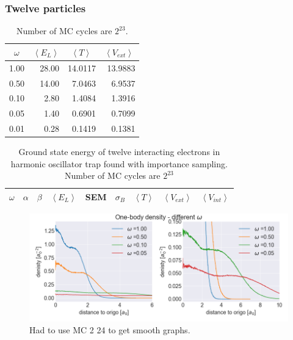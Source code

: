 \subsubsection{Twelve particles}

\begin{table}[H]\caption{Number of MC cycles are $2^{23}$. }\label{tab:ground_state_energy_importance_12p}
\center
\begin{tabular}{c|rrr}
$\omega$ & $\left< E_L \right>$  & $\left< T \right>\,\,\,$  & $\left< V_{ext}\right>\,$ \\ \hline
1.00 & 28.00 & 14.0117 & 13.9883\\ 
0.50 & 14.00 & 7.0463 & 6.9537\\ 
0.10 & 2.80 & 1.4084 & 1.3916\\ 
0.05 & 1.40 & 0.6901 & 0.7099\\ 
0.01 & 0.28 & 0.1419 & 0.1381\\ 
\end{tabular}
\end{table}

\begin{table}[H]\caption{Ground state energy of twelve interacting electrons in harmonic oscillator trap found with importance sampling. Number of MC cycles are $2^{23}$}\label{tab:ground_state_energy_importance_interaction_12p}
\center
\begin{tabular}{c|cccccccc}
$\omega$ & $\alpha$ & $\beta$ & $\left< E_L \right>$ & SEM & $\sigma_B$ &  $\left< T \right>$  & $\left< V_{ext}\right>$ & $\left<V_{int} \right>$  \\ \hline
\end{tabular}
\end{table}


\begin{figure}[H]
\center
\includegraphics[width=0.85\linewidth]{../Results/one_body_density_no_interaction_12p}\caption{Had to use MC 2 24 to get smooth graphs. }\label{fig:one_body_density_no_interaction_12p}
\end{figure}
